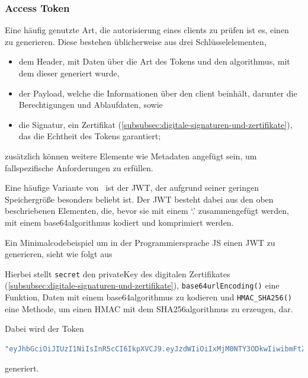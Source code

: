 \subsubsection[Access Token]{Access Token}\label{subsubsec:access-token}
Eine häufig genutzte Art, die \gls{autorisierung} eines \glspl{client} zu prüfen ist es, einen\  zu generieren.
Diese bestehen üblicherweise aus drei Schlüsselelementen,
\begin{itemize}
    \item dem Header, mit Daten über die Art des Tokens und den \gls{algorithmus}, mit dem dieser generiert wurde,
    \item der Payload, welche die Informationen über den \gls{client} beinhält, darunter \ua die Berechtigungen und Ablaufdaten, sowie
    \item die Signatur, ein Zertifikat (\autoref{subsubsec:digitale-signaturen-und-zertifikate}), das die Echtheit des Tokens garantiert;
\end{itemize}\label{itm:TokenElemente}
zusätzlich können weitere Elemente wie \zb Metadaten angefügt sein, um fallspezifische Anforderungen zu erfüllen.\autocite[\vglf][]{AccessTo39:online}

Eine häufige Variante von\  ist der \ac{JWT}, der aufgrund seiner geringen Speichergröße besonders beliebt ist.\autocite[\vglf][]{rfc7519} Der \ac{JWT} besteht dabei aus den oben beschriebenen Elementen, die, bevor sie mit einem `.' zusammengefügt werden, mit einem \gls{base64}\nonbreakdash \gls{algorithmus} kodiert und komprimiert werden.\autocite[\vglf][]{rfc7519}

Ein Minimalcodebeispiel um in der Programmiersprache \ac{JS} einen \ac{JWT} zu generieren, sieht wie folgt aus



Hierbei stellt \lstinline!secret! den \gls{privateKey} des digitalen Zertifikates (\autoref{subsubsec:digitale-signaturen-und-zertifikate}), \lstinline!base64urlEncoding()! eine Funktion, Daten mit einem \gls{base64}\nonbreakdash \gls{algorithmus} zu kodieren und \lstinline!HMAC_SHA256()! eine Methode, um einen \ac{HMAC} mit dem \gls{SHA256}\nonbreakdash\gls{algorithmus} zu erzeugen, dar.

Dabei wird der Token
\begin{lstlisting}[language = JavaScript,label={lst:jwt}]
"eyJhbGciOiJIUzI1NiIsInR5cCI6IkpXVCJ9.eyJzdWIiOiIxMjM0NTY3ODkwIiwibmFtZSI6IkpvaG4gRG9lIiwiaWF0IjoxNTE2MjM5MDIyfQ.SflKxwRJSMeKKF2QT4fwpMeJf36POk6yJV_adQssw5c"
\end{lstlisting}
generiert.


